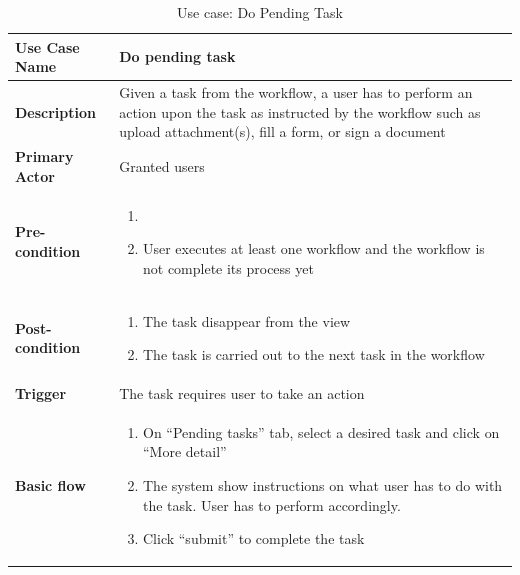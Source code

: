 \begin{table}
	\centering
	\caption{Use case: Do Pending Task}
	\begin{tabular}{|l|L{9cm}|}
		\hline
		\textbf{Use Case Name} & Do pending task \\
		\hline
		
		\textbf{Description} & Given a task from the workflow, a user has to perform an action upon the task as instructed by the workflow such as upload attachment(s), fill a form, or sign a document  \\
		\textbf{Primary Actor} & Granted users \\
		\textbf{Pre-condition} & \begin{enumerate}
			\item \alreadylogin
			\item User executes at least one workflow and the workflow is not complete its process yet
		\end{enumerate} \\
		\textbf{Post-condition} & 
		\begin{enumerate}
			\item The task disappear from the view 
			\item The task is carried out to the next task in the workflow
		\end{enumerate} \\
		\textbf{Trigger} & The task requires user to take an action \\
		\textbf{Basic flow} & 
		\begin{enumerate}
			\item On \enquote{Pending tasks} tab, select a desired task and click on \enquote{More detail}
			\item The system show instructions on what user has to do with the task.
			User has to perform accordingly.
			\item Click \enquote{submit} to complete the task
		\end{enumerate} \\
		\hline
	\end{tabular}
\end{table}

